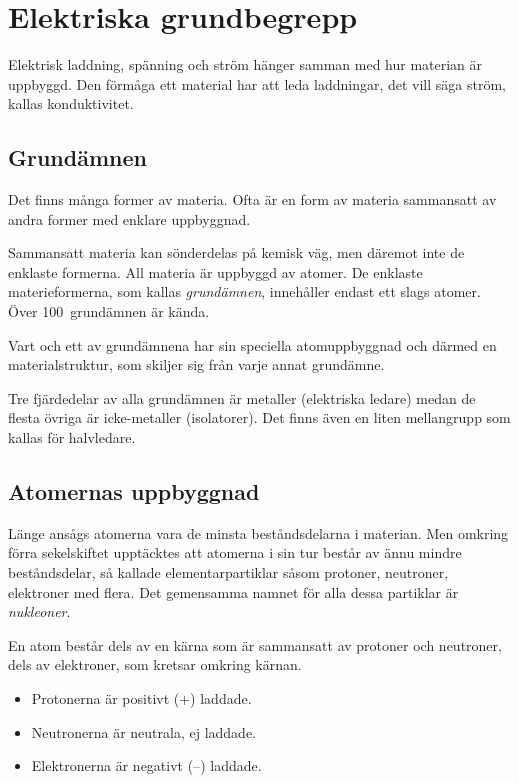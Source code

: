 \nobalance

\section{Elektriska grundbegrepp}


Elektrisk laddning, spänning och ström hänger samman med hur materian är
uppbyggd.
Den förmåga ett material har att leda laddningar, det vill säga ström, kallas
konduktivitet.

\subsection{Grundämnen}

Det finns många former av materia.
Ofta är en form av materia sammansatt av andra former med enklare uppbyggnad.

Sammansatt materia kan sönderdelas på kemisk väg, men däremot inte de enklaste
formerna.
All materia är uppbyggd av atomer.
De enklaste materieformerna, som kallas \emph{grundämnen}, innehåller endast
ett slags atomer.
Över 100~grundämnen är kända.

Vart och ett av grundämnena har sin speciella atomuppbyggnad och därmed en
materialstruktur, som skiljer sig från varje annat grundämne.

Tre fjärdedelar av alla grundämnen är metaller (elektriska ledare) medan de
flesta övriga är icke-metaller (isolatorer).
Det finns även en liten mellangrupp som kallas för halvledare.

\subsection{Atomernas uppbyggnad}

Länge ansågs atomerna vara de minsta beståndsdelarna i materian.
Men omkring förra sekelskiftet upptäcktes att atomerna i sin tur består av ännu
mindre beståndsdelar, så kallade elementarpartiklar såsom protoner, neutroner,
elektroner med flera.
Det gemensamma namnet för alla dessa partiklar är \emph{nukleoner}.

En atom består dels av en kärna som är sammansatt av protoner och neutroner,
dels av elektroner, som kretsar omkring kärnan.

\begin{itemize}
	\item Protonerna är positivt (+) laddade.
	\item Neutronerna är neutrala, ej laddade.
	\item Elektronerna är negativt (--) laddade.
\end{itemize}


